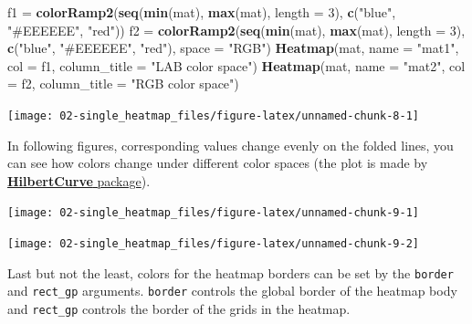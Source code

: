 \documentclass[]{book}
\newenvironment{Shaded}{\begin{snugshade}}{\end{snugshade}}
\newcommand{\KeywordTok}[1]{\textcolor[rgb]{0.13,0.29,0.53}{\textbf{#1}}}
\newcommand{\DataTypeTok}[1]{\textcolor[rgb]{0.13,0.29,0.53}{#1}}
\newcommand{\DecValTok}[1]{\textcolor[rgb]{0.00,0.00,0.81}{#1}}
\newcommand{\StringTok}[1]{\textcolor[rgb]{0.31,0.60,0.02}{#1}}
\newcommand{\NormalTok}[1]{#1}
\theoremstyle{definition}
\theoremstyle{definition}
\theoremstyle{definition}
\theoremstyle{remark}
\begin{document}
\begin{Shaded}
\begin{Highlighting}[]
\NormalTok{f1 =}\StringTok{ }\KeywordTok{colorRamp2}\NormalTok{(}\KeywordTok{seq}\NormalTok{(}\KeywordTok{min}\NormalTok{(mat), }\KeywordTok{max}\NormalTok{(mat), }\DataTypeTok{length =} \DecValTok{3}\NormalTok{), }\KeywordTok{c}\NormalTok{(}\StringTok{"blue"}\NormalTok{, }\StringTok{"#EEEEEE"}\NormalTok{, }\StringTok{"red"}\NormalTok{))}
\NormalTok{f2 =}\StringTok{ }\KeywordTok{colorRamp2}\NormalTok{(}\KeywordTok{seq}\NormalTok{(}\KeywordTok{min}\NormalTok{(mat), }\KeywordTok{max}\NormalTok{(mat), }\DataTypeTok{length =} \DecValTok{3}\NormalTok{), }\KeywordTok{c}\NormalTok{(}\StringTok{"blue"}\NormalTok{, }\StringTok{"#EEEEEE"}\NormalTok{, }\StringTok{"red"}\NormalTok{), }
    \DataTypeTok{space =} \StringTok{"RGB"}\NormalTok{)}
\KeywordTok{Heatmap}\NormalTok{(mat, }\DataTypeTok{name =} \StringTok{"mat1"}\NormalTok{, }\DataTypeTok{col =}\NormalTok{ f1, }\DataTypeTok{column_title =} \StringTok{"LAB color space"}\NormalTok{)}
\KeywordTok{Heatmap}\NormalTok{(mat, }\DataTypeTok{name =} \StringTok{"mat2"}\NormalTok{, }\DataTypeTok{col =}\NormalTok{ f2, }\DataTypeTok{column_title =} \StringTok{"RGB color space"}\NormalTok{)}
\end{Highlighting}
\end{Shaded}

\begin{center}\texttt{[image: 02-single\_heatmap\_files/figure-latex/unnamed-chunk-8-1]} \end{center}

In following figures, corresponding values change evenly on the folded
lines, you can see how colors change under different color spaces (the
plot is made by
\href{https://bioconductor.org/packages/release/bioc/html/HilbertCurve.html}{\textbf{HilbertCurve}
package}).

\begin{center}\texttt{[image: 02-single\_heatmap\_files/figure-latex/unnamed-chunk-9-1]} \end{center}

\begin{center}\texttt{[image: 02-single\_heatmap\_files/figure-latex/unnamed-chunk-9-2]} \end{center}

Last but not the least, colors for the heatmap borders can be set by the
\texttt{border} and \texttt{rect\_gp} arguments. \texttt{border}
controls the global border of the heatmap body and \texttt{rect\_gp}
controls the border of the grids in the heatmap.
\end{document}
